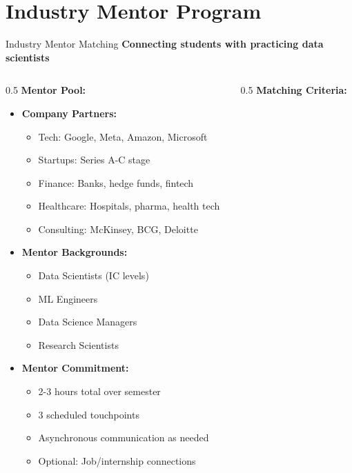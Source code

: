 \section{Industry Mentor Program}


\begin{frame}{Industry Mentor Matching}
\textbf{Connecting students with practicing data scientists}

\begin{columns}
\begin{column}{0.5\textwidth}
\textbf{Mentor Pool:}

\begin{itemize}
\item \textbf{Company Partners:}
   \begin{itemize}
   \item Tech: Google, Meta, Amazon, Microsoft
   \item Startups: Series A-C stage
   \item Finance: Banks, hedge funds, fintech
   \item Healthcare: Hospitals, pharma, health tech
   \item Consulting: McKinsey, BCG, Deloitte
   \end{itemize}

\item \textbf{Mentor Backgrounds:}
   \begin{itemize}
   \item Data Scientists (IC levels)
   \item ML Engineers
   \item Data Science Managers
   \item Research Scientists
   \end{itemize}

\item \textbf{Mentor Commitment:}
   \begin{itemize}
   \item 2-3 hours total over semester
   \item 3 scheduled touchpoints
   \item Asynchronous communication as needed
   \item Optional: Job/internship connections
   \end{itemize}
\end{itemize}
\end{column}

\begin{column}{0.5\textwidth}
\textbf{Matching Criteria:}


\end{column}
\end{columns}
\end{frame}
